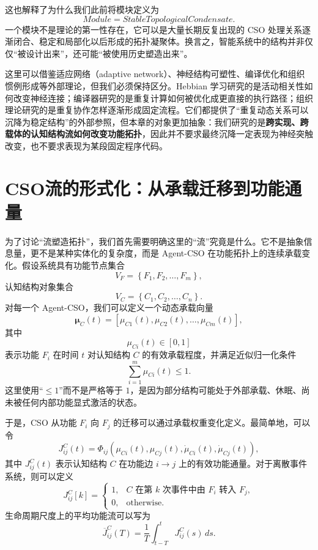 这也解释了为什么我们此前将模块定义为
\[
Module
=
StableTopologicalCondensate.
\]
一个模块不是理论的第一性存在，它可以是大量长期反复出现的 CSO 处理关系逐渐闭合、稳定和局部化以后形成的拓扑凝聚体。换言之，智能系统中的结构并非仅仅``被设计出来''，还可能``被使用历史塑造出来''。

这里可以借鉴适应网络（adaptive network）、神经结构可塑性、编译优化和组织惯例形成等外部理论，但我们必须保持区分。Hebbian 学习研究的是活动相关性如何改变神经连接；编译器研究的是重复计算如何被优化成更直接的执行路径；组织理论研究的是重复协作怎样逐渐形成固定流程。它们都提供了``重复动态关系可以沉降为稳定结构''的外部参照，但本章的对象更加抽象：我们研究的是\textbf{跨实现、跨载体的认知结构流如何改变功能拓扑}，因此并不要求最终沉降一定表现为神经突触改变，也不要求表现为某段固定程序代码。


\section{CSO流的形式化：从承载迁移到功能通量}

为了讨论``流塑造拓扑''，我们首先需要明确这里的``流''究竟是什么。它不是抽象信息量，更不是某种实体化的复杂度，而是 Agent-CSO 在功能拓扑上的连续承载变化。假设系统具有功能节点集合
\[
V_F
=
\left\{
F_1,F_2,\ldots,F_m
\right\},
\]
认知结构对象集合
\[
V_C
=
\left\{
C_1,C_2,\ldots,C_n
\right\}.
\]
对每一个 Agent-CSO，我们可以定义一个动态承载向量
\[
\boldsymbol{\mu}_{C}(t)
=
\left[
\mu_{C1}(t),
\mu_{C2}(t),
\ldots,
\mu_{Cm}(t)
\right],
\]
其中
\[
\mu_{Ci}(t)\in[0,1]
\]
表示功能 $F_i$ 在时间 $t$ 对认知结构 $C$ 的有效承载程度，并满足近似归一化条件
\[
\sum_{i=1}^{m}
\mu_{Ci}(t)
\leq 1.
\]
这里使用``$\leq 1$''而不是严格等于 $1$，是因为部分结构可能处于外部承载、休眠、尚未被任何内部功能显式激活的状态。

于是，CSO 从功能 $F_i$ 向 $F_j$ 的迁移可以通过承载权重变化定义。最简单地，可以令
\[
J_{ij}^{C}(t)
=
\Phi_{ij}
\left(
\mu_{Ci}(t),
\mu_{Cj}(t),
\dot{\mu}_{Ci}(t),
\dot{\mu}_{Cj}(t)
\right),
\]
其中 $J_{ij}^{C}(t)$ 表示认知结构 $C$ 在功能边 $i\rightarrow j$ 上的有效功能通量。对于离散事件系统，则可以定义
\[
J_{ij}^{C}[k]
=
\begin{cases}
1,&
C\text{ 在第 }k\text{ 次事件中由 }F_i
\text{ 转入 }F_j,\\
0,&
\text{otherwise}.
\end{cases}
\]
生命周期尺度上的平均功能流可以写为
\[
\overline{J}_{ij}^{C}(T)
=
\frac{1}{T}
\int_{t-T}^{t}
J_{ij}^{C}(s)\,ds.
\]

